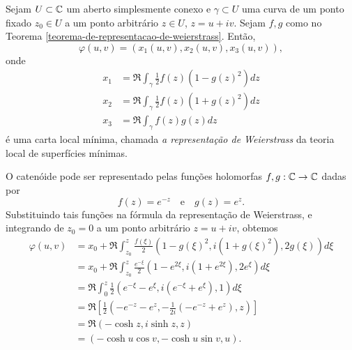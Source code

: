 \begin{definicao}
	Sejam $U \subset \mathbb{C}$ um aberto simplesmente conexo e $\gamma \subset U$ uma curva de um ponto fixado $z_0 \in U$ a um ponto arbitrário $z \in U$, $z = u + iv$.
	Sejam $f,g$ como no Teorema \ref{teorema-de-representacao-de-weierstrass}. Então,
	\begin{equation*}
	\varphi(u,v) = (x_1(u,v), x_2(u,v), x_3(u,v)),
	\end{equation*}
	onde
	\begin{align*}
	x_1 &= \Re \int_{\gamma} \frac{1}{2} f(z) (1 - g(z)^2) dz\\
	x_2 &= \Re \int_{\gamma} \frac{1}{2} f(z) (1 + g(z)^2) dz\\
	x_3 &= \Re \int_{\gamma} f(z) g(z) dz
	\end{align*}
	é uma carta local mínima, chamada \emph{a representação de Weierstrass} da teoria local de superfícies mínimas.
\end{definicao}

\begin{exemplo}[Catenóide]
	O catenóide pode ser representado pelas funções holomorfas $f, g: \mathbb{C} \rightarrow \mathbb{C}$ dadas por
	\begin{equation*}
	f(z) = e^{-z} \quad \text{e} \quad
	g(z) = e^z.
	\end{equation*}
	Substituindo tais funções na fórmula da representação de Weierstrass, e integrando de $z_0 = 0$ a um ponto arbitrário $z = u + iv$, obtemos
	\begin{align*}
	\varphi(u,v) &= x_0 + \Re \int_{z_0}^{z} \frac{f(\xi)}{2} (1 - g(\xi)^2, i (1 + g(\xi)^2), 2 g(\xi)) d\xi\\
	&= x_0 + \Re \int_{z_0}^{z} \frac{e^{-\xi}}{2} (1 - e^{2\xi}, i (1 + e^{2\xi}), 2e^{\xi}) d\xi\\
	&= \Re \int_{0}^{z} \frac{1}{2} (e^{-\xi} - e^{\xi}, i (e^{-\xi} + e^{\xi}), 1) d\xi\\
	&= \Re \left[ \frac{1}{2} \left(-e^{-z} - e^z, -\frac{1}{2i} (-e^{-z} + e^z), z \right) \right] \\
	&= \Re \left( -\cosh z, i \sinh z, z \right) \\
	&= \left( -\cosh u \cos v, -\cosh u \sin v, u \right).
	\end{align*} 
\end{exemplo}

